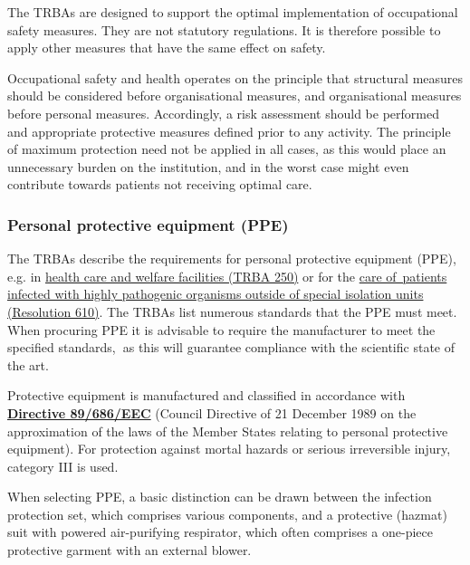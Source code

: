 \documentclass{article}
\begin{document}
The TRBAs are designed to support the optimal implementation of occupational safety measures. They are not statutory regulations. It is therefore possible to apply other measures that have the same effect on safety.


Occupational safety and health operates on the principle that structural measures should be considered before organisational measures, and organisational measures before personal measures. Accordingly, a risk assessment should be performed and appropriate protective measures defined prior to any activity. The principle of maximum protection need not be applied in all cases, as this would place an unnecessary burden on the institution, and in the worst case might even contribute towards patients not receiving optimal care.


\subsubsection{Personal protective equipment (PPE)}\label{H6303257}



The TRBAs describe the requirements for personal protective equipment (PPE), e.g. in \href{https://www.baua.de/DE/Angebote/Rechtstexte-und-Technische-Regeln/Regelwerk/TRBA/TRBA-250.html}{health care and welfare facilities (TRBA 250)} or for the \href{https://www.baua.de/DE/Angebote/Rechtstexte-und-Technische-Regeln/Regelwerk/TRBA/Beschluss-610.html}{care of patients infected with highly pathogenic organisms outside of special isolation units (Resolution 610)}. The TRBAs list numerous standards that the PPE must meet. When procuring PPE it is advisable to require the manufacturer to meet the specified standards,\textbf{ }as this will guarantee compliance with the scientific state of the art.


Protective equipment is manufactured and classified in accordance with \textbf{\href{https://eur-lex.europa.eu/legal-content/EN/TXT/?uri=celex%3A31989L0686}{Directive 89/686/EEC}} (Council Directive of 21 December 1989 on the approximation of the laws of the Member States relating to personal protective equipment). For protection against mortal hazards or serious irreversible injury, category III is used.


When selecting PPE, a basic distinction can be drawn between the infection protection set, which comprises various components, and a protective (hazmat) suit with powered air-purifying respirator, which often comprises a one-piece protective garment with an external blower.
\end{document}
